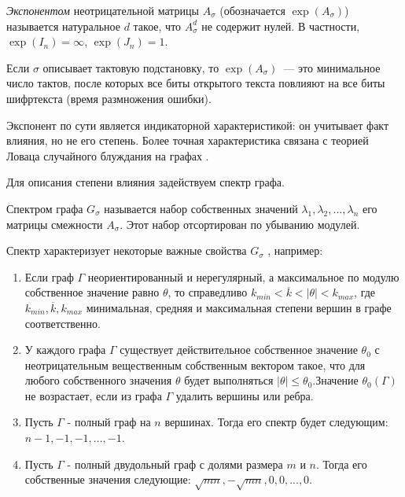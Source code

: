 \documentclass[a4paper,12pt]{report}
\theoremstyle{plain} %
\theoremstyle{definition}
\theoremstyle{remark}
\begin{document}
\begin{large}
{\it Экспонентом} неотрицательной матрицы $A_\sigma$
(обозначается $\exp(A_\sigma)$)
называется натуральное $d$ такое, что 
$A_\sigma^d$ не содержит нулей.
В частности, $\exp(I_n)=\infty$, $\exp(J_n)=1$.

Если $\sigma$ описывает тактовую подстановку,
то $\exp(A_\sigma)$~--- это минимальное число тактов,
после которых все биты открытого текста повлияют 
на все биты шифртекста (время размножения ошибки).


Экспонент по сути является индикаторной характеристикой:
он учитывает факт влияния, но не его степень.
Более точная характеристика связана с теорией Ловаца
случайного блуждания на графах \cite{lovasz_walks}.

Для описания степени влияния задействуем спектр графа.

Спектром графа $G_{\sigma}$ называется набор собственных значений $\lambda_1, \lambda_2,...,\lambda_n$ его матрицы смежности $A_{\sigma}$. Этот набор отсортирован по убыванию модулей. 

Спектр характеризует некоторые важные свойства $G_{\sigma}$ \cite{lovasz_eigenvalues}, например:

\begin{enumerate}

\item Если граф $\Gamma$ неориентированный и нерегулярный, а максимальное по модулю собственное значение равно $\theta$, то справедливо $k_{min} < \overline{k} < |\theta| < k_{max}$, где $k_{min}, \overline{k}, k_{max}$ минимальная, средняя и максимальная степени вершин в графе соответственно.

\item У каждого графа $\Gamma$ существует действительное собственное значение $\theta_0$ с неотрицательным вещественным собственным вектором такое, что для любого собственного значения $\theta$ будет выполняться $|\theta| \leq \theta_0$.Значение $\theta_0(\Gamma)$ не возрастает, если из графа $\Gamma$ удалить вершины или ребра.

\item Пусть $\Gamma$ - полный граф на $n$ вершинах. Тогда его спектр будет следующим: $n-1,-1,-1,...,-1$.

\item Пусть $\Gamma$ - полный двудольный граф  с долями размера $m$ и $n$. Тогда его собственные значения следующие: $\sqrt{mn}, -\sqrt{mn},0,0,...,0.$

\end{enumerate}


\end{large}
\end{document}
